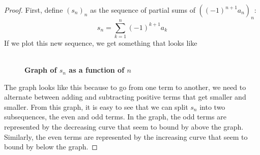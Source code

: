 \documentclass[10pt]{article}
\theoremstyle{definition}
\begin{document}
\begin{proof}
    First, define $(s_n)_n$ as the sequence of partial sums of $((-1)^{n+1}a_n)_n$:
    $$s_n = \sum_{k=1}^{n}(-1)^{k+1}a_k$$
    If we plot this new sequence, we get something that looks like
    \begin{figure}[h]
        \centering
        \\ \textbf{Graph of $s_n$ as a function of $n$}
    \end{figure}

    The graph looks like this because to go from one term to another, we need to alternate between adding and subtracting positive terms that get smaller and smaller. From this graph, it is easy to see that we can split $s_n$ into two subsequences, the even and odd terms. In the graph, the odd terms are represented by the decreasing curve that seem to bound by above the graph. Similarly, the even terms are represented by the increasing curve that seem to bound by below the graph. 


\end{proof}
\end{document}
